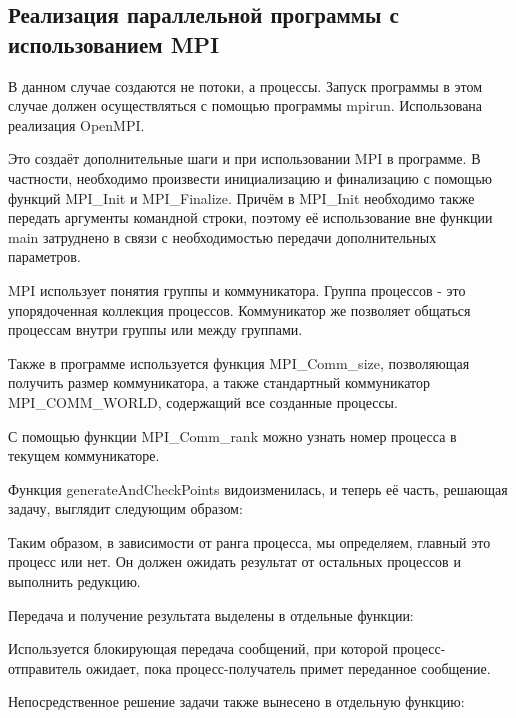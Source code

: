 \subsection{Реализация параллельной программы с использованием MPI}

В данном случае создаются не потоки, а процессы. Запуск программы в этом случае должен осуществляться с помощью программы mpirun. Использована реализация OpenMPI.

Это создаёт дополнительные шаги и при использовании MPI в программе. В частности, необходимо произвести инициализацию и финализацию с помощью функций MPI\_Init и MPI\_Finalize. Причём в MPI\_Init необходимо также передать аргументы командной строки, поэтому её использование вне функции main затруднено в связи с необходимостью передачи дополнительных параметров.

MPI использует понятия группы и коммуникатора. Группа процессов - это упорядоченная коллекция процессов. Коммуникатор же позволяет общаться процессам внутри группы или между группами.

Также в программе используется функция MPI\_Comm\_size, позволяющая получить размер коммуникатора, а также стандартный коммуникатор MPI\_COMM\_WORLD, содержащий все созданные процессы.

С помощью функции MPI\_Comm\_rank можно узнать номер процесса в текущем коммуникаторе.

Функция generateAndCheckPoints видоизменилась, и теперь её часть, решающая задачу, выглядит следующим образом:



Таким образом, в зависимости от ранга процесса, мы определяем, главный это процесс или нет. Он должен ожидать результат от остальных процессов и выполнить редукцию.

Передача и получение результата выделены в отдельные функции:



Используется блокирующая передача сообщений, при которой процесс-отправитель ожидает, пока процесс-получатель примет переданное сообщение.

Непосредственное решение задачи также вынесено в отдельную функцию:




